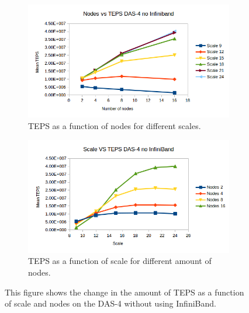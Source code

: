 \begin{figure}[!h]
\centering
\begin{subfigure}{.5\textwidth}
  \centering
  \includegraphics[width=\linewidth]{images/nodes_no_infini.png}
  \caption{TEPS as a function of nodes for different scales.}
  \label{fig:nodes_no_infini}
\end{subfigure}%
\begin{subfigure}{.5\textwidth}
  \centering
  \includegraphics[width=\linewidth]{images/scale_no_infini.png}
  \caption{TEPS as a function of scale for different amount of nodes.}
  \label{fig:scale_no_infini}
\end{subfigure}
\caption{This figure shows the change in the amount of TEPS as a function of scale and nodes on the DAS-4 without using InfiniBand.}
\label{fig:das_no_infini}
\end{figure}

